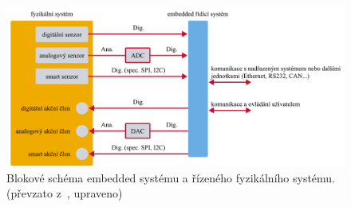 \documentclass[a4paper, twoside, 11pt]{article}
\newcommand{\fbar}{\FloatBarrier}
\begin{document}
	\begin{figure}[htbp!]
		\centering
			\includegraphics[width=1\textwidth]{src/pdf/embedded-system-scheme.pdf} 
			\caption{Blokové schéma embedded systému a řízeného fyzikálního systému. (převzato z~\cite{juan-fpgas}, upraveno)}
			\label{fig:embedded-system-scheme}
	\end{figure}

		\fbar
\end{document}
